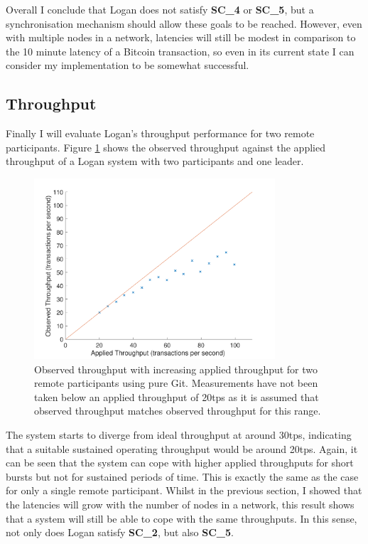 \documentclass[12pt,a4paper,twoside,openright]{report}
\begin{document}
	Overall I conclude that Logan does not satisfy \textbf{SC\_4} or \textbf{SC\_5}, but a synchronisation mechanism should allow these goals to be reached. 
	However, even with multiple nodes in a network, latencies will still be modest in comparison to the 10 minute latency of a Bitcoin transaction, so even in its current state I can consider my implementation to be somewhat successful.

	\subsection{Throughput}
	Finally I will evaluate Logan's throughput performance for two remote participants.
	Figure \ref{figs:tworemthrthr} shows the observed throughput against the applied throughput of a Logan system with two participants and one leader.
	\begin{figure}
		\centering
		\includegraphics[width=0.8\textwidth]{figs/appliedvsobserved2r.pdf}
		\caption{Observed throughput with increasing applied throughput for two remote participants using pure Git. Measurements have not been taken below an applied throughput of 20tps as it is assumed that observed throughput matches observed throughput for this range.}
		\label{figs:tworemthrthr}
	\end{figure}
	The system starts to diverge from ideal throughput at around 30tps, indicating that a suitable sustained operating throughput would be around 20tps.
	Again, it can be seen that the system can cope with higher applied throughputs for short bursts  but not for sustained periods of time. 
	This is exactly the same as the case for only a single remote participant. 
	Whilst in the previous section, I showed that the latencies will grow with the number of nodes in a network, this result shows that a system will still be able to cope with the same throughputs. 
	In this sense, not only does Logan satisfy \textbf{SC\_2}, but also \textbf{SC\_5}.
\end{document}
